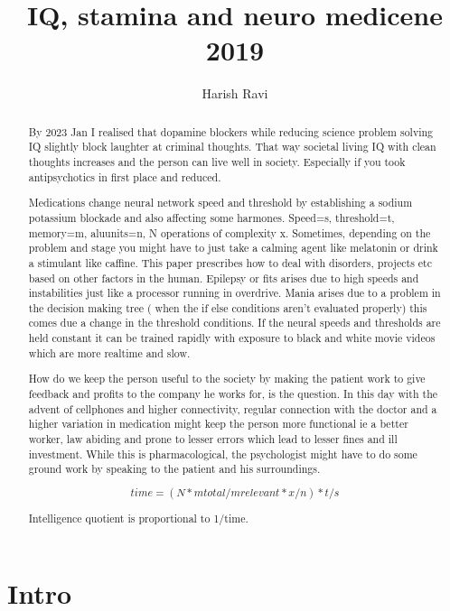 \documentclass[a4paper]{article}
\title{ IQ, stamina and neuro medicene 2019}
\author{Harish Ravi}
\begin{document}
\maketitle

\begin{abstract}
By 2023 Jan I realised that dopamine blockers while reducing science problem solving IQ slightly block laughter at criminal thoughts. That way societal living IQ with clean thoughts increases and the person can live well in society. Especially if you took antipsychotics in first place and reduced.

Medications change neural network speed and threshold by establishing a sodium potassium blockade and also affecting some harmones. Speed=s, threshold=t, memory=m, aluunits=n, N operations of complexity x. Sometimes, depending on the problem and stage you might have to just take a calming agent like melatonin or drink a stimulant like caffine. This paper prescribes how to deal with disorders, projects etc based on other factors in the human. Epilepsy or fits arises due to high speeds and instabilities just like a processor running in overdrive. Mania arises due to a problem in the decision making tree ( when the if else conditions aren't evaluated properly) this comes due a change in the threshold conditions. If the neural speeds and thresholds are held constant it can be trained rapidly with exposure to black and white movie videos which are more realtime and slow.

How do we keep the person useful to the society by making the patient work to give feedback and profits to the company he works for, is the question. In this day with the advent of cellphones and higher connectivity, regular connection with the doctor and a higher variation in medication might keep the person more functional ie a better worker, law abiding and prone to lesser errors which lead to lesser fines and ill investment. While this is pharmacological, the psychologist might have to do some ground work by speaking to the patient and his surroundings.



$$time=(N*mtotal/mrelevant*x/n)*t/s$$

Intelligence quotient is proportional to 1/time.

\end{abstract}

\section{Intro}
\end{document}
